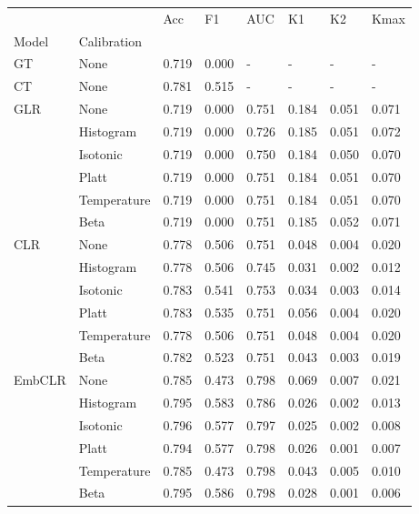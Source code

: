 \begin{tabular}{llllllll}
\toprule
 &  & Acc & F1 & AUC & K1 & K2 & Kmax \\
Model & Calibration &  &  &  &  &  &  \\
\midrule
GT & None & 0.719 & 0.000 & - & - & - & - \\
\cline{1-8}
CT & None & 0.781 & 0.515 & - & - & - & - \\
\cline{1-8}
\multirow[t]{6}{*}{GLR} & None & 0.719 & 0.000 & 0.751 & 0.184 & 0.051 & 0.071 \\
 & Histogram & 0.719 & 0.000 & 0.726 & 0.185 & 0.051 & 0.072 \\
 & Isotonic & 0.719 & 0.000 & 0.750 & 0.184 & 0.050 & 0.070 \\
 & Platt & 0.719 & 0.000 & 0.751 & 0.184 & 0.051 & 0.070 \\
 & Temperature & 0.719 & 0.000 & 0.751 & 0.184 & 0.051 & 0.070 \\
 & Beta & 0.719 & 0.000 & 0.751 & 0.185 & 0.052 & 0.071 \\
\cline{1-8}
\multirow[t]{6}{*}{CLR} & None & 0.778 & 0.506 & 0.751 & 0.048 & 0.004 & 0.020 \\
 & Histogram & 0.778 & 0.506 & 0.745 & 0.031 & 0.002 & 0.012 \\
 & Isotonic & 0.783 & 0.541 & 0.753 & 0.034 & 0.003 & 0.014 \\
 & Platt & 0.783 & 0.535 & 0.751 & 0.056 & 0.004 & 0.020 \\
 & Temperature & 0.778 & 0.506 & 0.751 & 0.048 & 0.004 & 0.020 \\
 & Beta & 0.782 & 0.523 & 0.751 & 0.043 & 0.003 & 0.019 \\
\cline{1-8}
\multirow[t]{6}{*}{EmbCLR} & None & 0.785 & 0.473 & 0.798 & 0.069 & 0.007 & 0.021 \\
 & Histogram & 0.795 & 0.583 & 0.786 & 0.026 & 0.002 & 0.013 \\
 & Isotonic & 0.796 & 0.577 & 0.797 & 0.025 & 0.002 & 0.008 \\
 & Platt & 0.794 & 0.577 & 0.798 & 0.026 & 0.001 & 0.007 \\
 & Temperature & 0.785 & 0.473 & 0.798 & 0.043 & 0.005 & 0.010 \\
 & Beta & 0.795 & 0.586 & 0.798 & 0.028 & 0.001 & 0.006 \\
\cline{1-8}
\bottomrule
\end{tabular}
